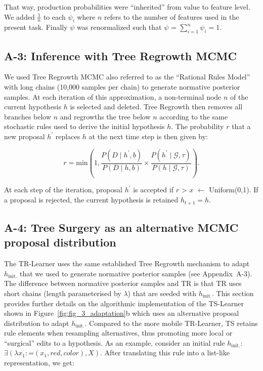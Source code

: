 \documentclass[doc,natbib,floatsintext]{apa7}
\newcommand{\hi}{h_{\mathrm{init.}}}
\begin{document}
\begin{appendices}
That way, production probabilities were ``inherited'' from value to feature level. We added \(\frac{1}{n}\) to each  \(\psi_{i}\) where \(n\) refers to the number of features used in the present task. Finally \(\psi\) was renormalized such that \(\psi\) =  \(\sum_{i=1}^{n}\psi_{i} = 1\).

 
\subsection{A-3: Inference with Tree Regrowth MCMC}\label{ap:a3_inference}

We used Tree Regrowth MCMC also referred to as the ``Rational Rules Model'' \citep{goodman2008rational} with long chains (10,000 samples per chain) to generate normative posterior samples. At each iteration of this approximation, a non-terminal node \(n\) of the current hypothesis \(h\) is selected and deleted. Tree Regrowth then removes all branches below \(n\) and regrowths the tree below \(n\) according to the same stochastic rules used to derive the initial hypothesis \(h\). The probability \(r\) that a new proposal \(h^{'}\) replaces $h$ at the next time step is then given by:

\begin{equation} 
    r = \text{min}(1, \frac{P(D \mid h^{'},b)}{P(D\mid h,b)} \times \frac{P(h^{'}\mid\mathcal{G},\tau)}{P(h\mid\mathcal{G},\tau)}).
\label{equ:equ_a3_1_mcmc}
\end{equation}

At each step of the iteration, proposal \(h^{'}\) is accepted if \(r\) > \(x\) $\leftarrow$ \(\text{Uniform}\)(0,1). If a proposal is rejected, the current hypothesis is retained \(h_{t+1} = h\). 


\subsection{A-4: Tree Surgery as an alternative MCMC proposal distribution}\label{ap:a4_ts_details}
The TR-Learner uses the same established Tree Regrowth mechanism to adapt $\hi$ that we used to generate normative posterior samples (see Appendix~A-3). The difference between normative posterior samples and TR is that TR uses short chains (length parameterised by $\lambda$) that are seeded with $\hi$. This section provides further details on the algorithmic implementation of the TS-Learner shown in Figure~\ref{fig:fig_3_adaptation}b which uses an alternative proposal distribution to adapt $\hi$. Compared to the more mobile TR-Learner, TS retains rule elements when resampling alternatives, thus promoting more local or ``surgical'' edits to a hypothesis. As an example, consider an initial rule \(\hi\): \(\exists(\lambda x_{1}: \text{=}(x_{1},red,color), X)\). After translating this rule into a list-like representation, we get: 


\end{appendices}
\end{document}
